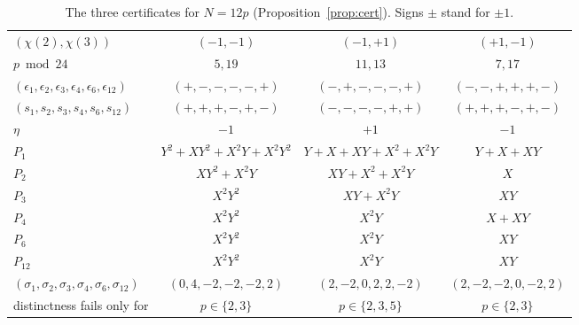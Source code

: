 \documentclass[11pt,a4paper]{article}
\theoremstyle{definition}
\theoremstyle{remark}
\begin{document}
\begin{table}[ht]
\centering
\footnotesize
\begin{tabular}{@{}lccc@{}}
\toprule
$(\chi(2),\chi(3))$ & $(-1,-1)$ & $(-1,+1)$ & $(+1,-1)$\\
$p\bmod 24$ & $5,19$ & $11,13$ & $7,17$\\
\midrule
$(\epsilon_1,\epsilon_2,\epsilon_3,\epsilon_4,\epsilon_6,\epsilon_{12})$ & $(+,-,-,-,-,+)$ & $(-,+,-,-,-,+)$ & $(-,-,+,+,+,-)$\\
$(s_1,s_2,s_3,s_4,s_6,s_{12})$ & $(+,+,+,-,+,-)$ & $(-,-,-,-,+,+)$ & $(+,+,+,-,+,-)$\\
$\eta$ & $-1$ & $+1$ & $-1$\\
$P_1$ & $Y^2+XY^2+X^2Y+X^2Y^2$ & $Y+X+XY+X^2+X^2Y$ & $Y+X+XY$\\
$P_2$ & $XY^2+X^2Y$ & $XY+X^2+X^2Y$ & $X$\\
$P_3$ & $X^2Y^2$ & $XY+X^2Y$ & $XY$\\
$P_4$ & $X^2Y^2$ & $X^2Y$ & $X+XY$\\
$P_6$ & $X^2Y^2$ & $X^2Y$ & $XY$\\
$P_{12}$ & $X^2Y^2$ & $X^2Y$ & $XY$\\
$(\sigma_1,\sigma_2,\sigma_3,\sigma_4,\sigma_6,\sigma_{12})$ & $(0,4,-2,-2,-2,2)$ & $(2,-2,0,2,2,-2)$ & $(2,-2,-2,0,-2,2)$\\
distinctness fails only for & $p\in\{2,3\}$ & $p\in\{2,3,5\}$ & $p\in\{2,3\}$\\
\bottomrule
\end{tabular}
\caption{The three certificates for $N=12p$ (Proposition~\ref{prop:cert}). Signs $\pm$ stand for $\pm1$.}\label{tab:cert12}
\end{table}
\end{document}

